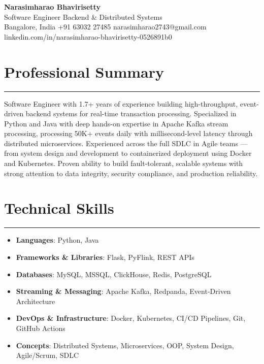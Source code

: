 \documentclass[10pt]{article}
\begin{document}
\begin{center}
  {\huge\textbf{Narasimharao Bhavirisetty}}\\[3pt]
  Software Engineer \textbullet{} Backend \& Distributed Systems \\[3pt]
  Bangalore, India \textbullet{} +91 63032 27485 \textbullet{} narasimharao2743@gmail.com \textbullet{} linkedin.com/in/narasimharao-bhavirisetty-0526891b0
\end{center}

\vspace{4pt}

\section*{Professional Summary}
\vspace{1pt}\hrule\vspace{4pt}
Software Engineer with 1.7+ years of experience building high-throughput, event-driven backend systems for real-time transaction processing. Specialized in Python and Java with deep hands-on expertise in Apache Kafka stream processing, processing 50K+ events daily with millisecond-level latency through distributed microservices. Experienced across the full SDLC in Agile teams — from system design and development to containerized deployment using Docker and Kubernetes. Proven ability to build fault-tolerant, scalable systems with strong attention to data integrity, security compliance, and production reliability.

\section*{Technical Skills}
\vspace{1pt}\hrule\vspace{4pt}
\begin{itemize}
  \item \textbf{Languages}: Python, Java
  \item \textbf{Frameworks \& Libraries}: Flask, PyFlink, REST APIs
  \item \textbf{Databases}: MySQL, MSSQL, ClickHouse, Redis, PostgreSQL
  \item \textbf{Streaming \& Messaging}: Apache Kafka, Redpanda, Event-Driven Architecture
  \item \textbf{DevOps \& Infrastructure}: Docker, Kubernetes, CI/CD Pipelines, Git, GitHub Actions
  \item \textbf{Concepts}: Distributed Systems, Microservices, OOP, System Design, Agile/Scrum, SDLC
\end{itemize}
\end{document}
